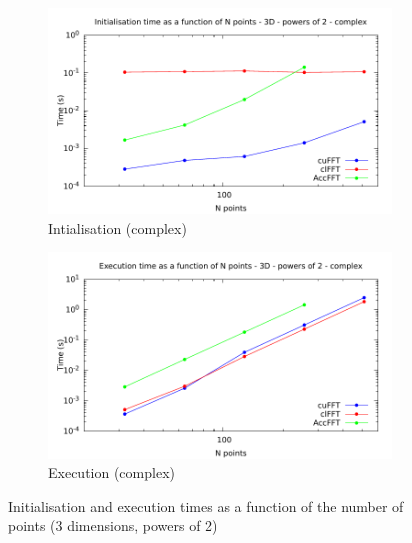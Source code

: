 \documentclass[12pt, a4paper]{article}
\begin{document}
\begin{figure}[H]
\begin{subfigure}{.5\textwidth}
\label{FFTPOW23DRE}
\end{subfigure}\\
\begin{subfigure}{.5\textwidth}
\centering
\includegraphics[width=.9\linewidth]{graphs/fft-3d-pow2-c-init.pdf}
\caption{Intialisation (complex)}
\label{FFTPOW23DCI}
\end{subfigure}%
\begin{subfigure}{.5\textwidth}
\centering
\includegraphics[width=.9\linewidth]{graphs/fft-3d-pow2-c-exec.pdf}
\caption{Execution (complex)}
\label{FFTPOW23DCE}
\end{subfigure}
\caption{Initialisation and execution times as a function of the number of points (3 dimensions, powers of 2)}
\label{FFTPOW23D}
\end{figure}
\end{document}
